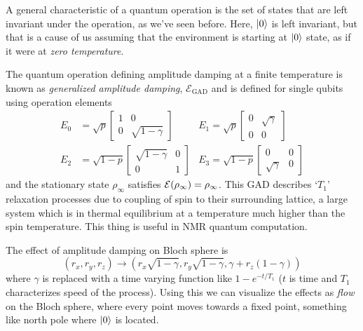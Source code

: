 A general characteristic of a quantum operation is the set of states that are left invariant under the operation, as we've seen before. Here, $\ket{0}$ is left invariant, but that is a cause of us assuming that the environment is starting at $\ket{0}$ state, as if it were at \textit{zero temperature}.

The quantum operation defining amplitude damping at a finite temperature is known as \textit{generalized amplitude damping}, $\mathcal{E}_{\text{GAD}}$ and is defined for single qubits using operation elements
\begin{align}
    E_0 &= \sqrt{p}\begin{bmatrix}
        1 & 0 \\ 0 & \sqrt{1-\gamma}
    \end{bmatrix}
    &E_1 = \sqrt{p}\begin{bmatrix}
        0 & \sqrt{\gamma} \\ 0 & 0
    \end{bmatrix}
    \\
    E_2 &= \sqrt{1-p}\begin{bmatrix}
        \sqrt{1-\gamma} & 0 \\ 0 & 1
    \end{bmatrix}
    &E_3 = \sqrt{1-p}\begin{bmatrix}
        0 & 0 \\ \sqrt{\gamma} & 0
    \end{bmatrix}
\end{align}
and the stationary state $\rho_\infty$ satisfies $\operatorname{\mathcal{E}}(\rho_\infty) = \rho_\infty$. This  GAD describes `$T_1$' relaxation processes due to coupling of spin to their surrounding lattice, a large system which is in thermal equilibrium at a temperature much higher than the spin temperature. This thing is useful in NMR quantum computation.

The effect of amplitude damping on Bloch sphere is 
\begin{equation}
    (r_x, r_y, r_z) \longrightarrow \left(r_x\sqrt{1-\gamma}, r_y\sqrt{1-\gamma}, \gamma+r_z(1-\gamma)\right)
\end{equation}
where $\gamma$ is replaced with a time varying function like $1-e^{-t/T_1}$ ($t$ is time and $T_1$ characterizes speed of the process). Using this we can visualize the effects as \textit{flow} on the Bloch sphere, where every point moves towards a fixed point, something like north pole where $\ket{0}$ is located.

